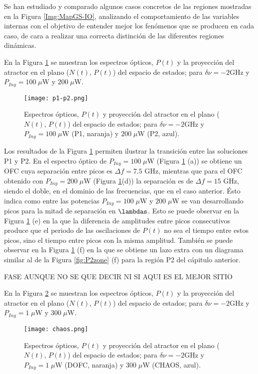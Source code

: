 Se han estudiado y comparado algunos casos concretos de las regiones mostradas en la Figura \ref{Img:MapGS-IO}, analizando el comportamiento de las variables internas con el objetivo de entender mejor los fen\'omenos que se producen en cada caso, de cara a realizar una correcta distinci\'on de las diferentes regiones din\'amicas.

En la Figura \ref{fig:p1-p2} se muestran los espectros \'opticos, $P(t)$ y la proyecci\'on del atractor en el plano ($N(t)$, $P(t)$) del espacio de estados; para $\delta\nu = -2$GHz y $P_{Iny} = 100\;\mu$W y $200\;\mu$W.

	\begin{figure}[H]
		\centering
		\texttt{[image: p1-p2.png]}
		\caption{\label{fig:p1-p2}Espectros \'opticos, $P(t)$ y proyecci\'on del atractor en el plano ($N(t)$, $P(t)$) del espacio de estados; para $\delta\nu = -2$GHz y $P_{Iny} = 100\;\mu$W (P1, naranja) y $200\;\mu$W (P2, azul).}	
	\end{figure}

	Los resultados de la Figura \ref{fig:p1-p2} permiten ilustrar la transición entre las soluciones P1 y P2. En el espectro \'optico de $P_{Iny} = 100\;\mu$W (Figura \ref{fig:p1-p2} (a)) se obtiene un OFC cuya separaci\'on entre picos es $\Delta f = 7.5$ GHz, mientras que para el OFC obtenido con $P_{Iny} = 200\;\mu$W (Figura \ref{fig:p1-p2}(d)) la separaci\'on es de $\Delta f = 15$ GHz, siendo el doble, en el dominio de las frecuencias, que en el caso anterior. \'Esto indica como entre las potencias $P_{Iny} = 100\;\mu$W y $200\;\mu$W se van desarrollando picos para la mitad de separación en $\lambdas$. Esto se puede observar en la Figura \ref{fig:p1-p2} (e) en la que la diferencia de amplitudes entre picos consecutivos produce que el periodo de las oscilaciones de $P(t)$ no sea el tiempo entre estos picos, sino el tiempo entre picos con la misma amplitud. Tambi\'en se puede observar en la Figura \ref{fig:p1-p2} (f) en la que se obtiene un lazo extra con un diagrama similar al de la Figura \ref{fig:P2zone} (f) para la regi\'on P2 del c\'apitulo anterior.

FASE AUNQUE NO SE QUE DECIR NI SI AQUI ES EL MEJOR SITIO

En la Figura \ref{fig:chaos} se muestran los espectros \'opticos, $P(t)$ y la proyecci\'on del atractor en el plano ($N(t)$, $P(t)$) del espacio de estados; para $\delta\nu = -2$GHz y $P_{Iny} = 1\;\mu$W y $300\;\mu$W.

	\begin{figure}[H]
		\centering
		\texttt{[image: chaos.png]}
		\caption{\label{fig:chaos}Espectros \'opticos, $P(t)$ y proyecci\'on del atractor en el plano ($N(t)$, $P(t)$) del espacio de estados; para $\delta\nu = -2$GHz y $P_{Iny} = 1\;\mu$W (DOFC, naranja) y $300\;\mu$W (CHAOS, azul).}	
	\end{figure}

